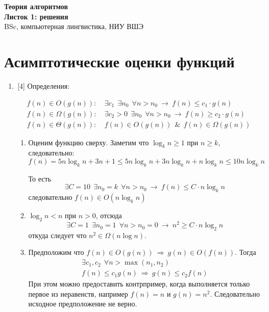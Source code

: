 \documentclass[12pt]{extarticle}
\begin{document}
\begin{center}
\textbf{\LARGE{Теория алгоритмов}}\\
\textbf{\Large{Листок 1: решения}}\\
BSc, компьютерная лингвистика, НИУ ВШЭ\\
\end{center}


\section{Асимптотические оценки функций}

\begin{enumerate}

  \item\,[4] Определения:
  
    $$
    \begin{aligned}
    f(n) \in O(g(n)): &~ \exists c_1 ~~ \exists n_0 ~~ \forall n > n_0 ~\to~ f(n) \leqslant c_1 \cdot g(n) \\
    f(n) \in \Omega(g(n)): &~ \exists c_2>0 ~~ \exists n_0 ~~ \forall n > n_0 ~\to~ f(n) \geqslant c_2 \cdot g(n) \\
    f(n) \in \Theta(g(n)): &~ f(n) \in O(g(n)) ~~\&~~ f(n) \in \Omega(g(n))
    \end{aligned}
    $$
  
    \begin{enumerate}
      \item Оценим функцию сверху. Заметим что $\log_k{n} \geqslant 1$ при $n \geqslant k$, следовательно:
      $$
      f(n) = 5n\log_k{n} + 3n + 1 \leqslant
      5n\log_k{n} + 3n\log_k{n} + n\log_k{n} \leqslant
      10n\log_k{n}
      $$
      
      То есть
      $$
      \exists C = 10 ~~ \exists n_0 = k ~~ \forall n > n_0 ~\to~ f(n) \leqslant C \cdot n\log_k{n}
      $$
      следовательно $f(n) \in O(n\log_k{n})$
      
      \item $\log_{2} n < n$ при $n > 0$, отсюда
      $$
      \exists C = 1 ~~ \exists n_0 = 1 ~~ \forall n > n_0 = 0 ~\to~ n^2 \geqslant C \cdot n\log_2{n}
      $$
      откуда следует что $n^2 \in \Omega(n \log n)$.

      \item Предположим что $f(n) \in O(g(n)) ~\Rightarrow~ g(n) \in O(f(n))$. Тогда
      $$
      \begin{gathered}
      \exists c_1, c_2 ~~ \forall n > \max(n_1, n_2)\\
      f(n) \leqslant c_1 g(n) ~\Rightarrow~  g(n) \leqslant c_2 f(n)
      \end{gathered}
      $$
      При этом можно предоставить контрпример, когда выполняется только первое из неравенств, например $f(n)=n$ и $g(n)=n^2$. Следовательно исходное предположение не верно.


\end{enumerate}
\end{enumerate}
\end{document}
